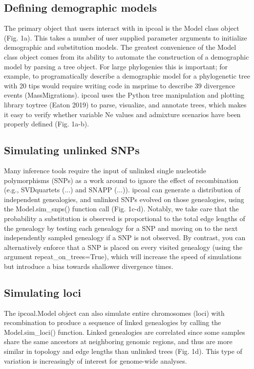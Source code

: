 \documentclass[11pt]{article}
\begin{document}
\subsection{Defining demographic models}
The primary object that users interact with in ipcoal is the Model class object (Fig. 1a). This takes a number of user supplied parameter arguments to initialize demographic and substitution models. The greatest convenience of the Model class object comes from its ability to automate the construction of a demographic model by parsing a tree object. For large phylogenies this is important; for example, to programatically describe a demographic model for a phylogenetic tree with 20 tips would require writing code in msprime to describe 39 divergence events (MassMigrations). ipcoal uses the Python tree manipulation and plotting library toytree (Eaton 2019) to parse, visualize, and annotate trees, which makes it easy to verify whether variable Ne values and admixture scenarios have been properly defined (Fig. 1a-b). 

\subsection{Simulating unlinked SNPs}
Many inference tools require the input of unlinked single nucleotide polymorphisms (SNPs) as a work around to ignore the effect of recombination (e.g., SVDquartets (...) and SNAPP (...)). ipcoal can generate a distribution of independent genealogies, and unlinked SNPs evolved on those genealogies, using the Model.sim\_snps() function call (Fig. 1c-d). Notably, we take care that the probability a substitution is observed is proportional to the total edge lengths of the genealogy by testing each genealogy for a SNP and moving on to the next independently sampled genealogy if a SNP is not observed. By contrast, you can alternatively enforce that a SNP is placed on every visited genealogy (using the argument repeat\_on\_trees=True), which will increase the speed of simulations but introduce a bias towards shallower divergence times. 

\subsection{Simulating loci}
The ipcoal.Model object can also simulate entire chromosomes (loci) with recombination to produce a sequence of linked genealogies by calling the Model.sim\_loci() function. Linked genealogies are correlated since some samples share the same ancestors at neighboring genomic regions, and thus are more similar in topology and edge lengths than unlinked trees (Fig. 1d). This type of variation is increasingly of interest for genome-wide analyses.
\end{document}
